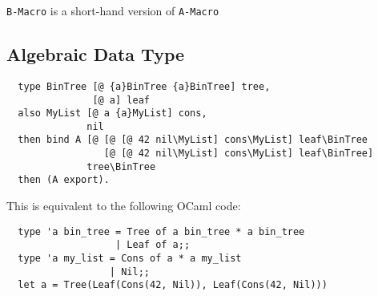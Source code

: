 \documentclass{book}
\begin{document}
\texttt{B-Macro} is a short-hand version of \texttt{A-Macro}

\subsection{Algebraic Data Type}
\label{ssec:adt-example}
\begin{verbatim}
  type BinTree [@ {a}BinTree {a}BinTree] tree,
               [@ a] leaf
  also MyList [@ a {a}MyList] cons,
              nil
  then bind A [@ [@ [@ 42 nil\MyList] cons\MyList] leaf\BinTree
                 [@ [@ 42 nil\MyList] cons\MyList] leaf\BinTree]
              tree\BinTree
  then (A export).
\end{verbatim}

This is equivalent to the following OCaml code:
\begin{verbatim}
  type 'a bin_tree = Tree of a bin_tree * a bin_tree
                   | Leaf of a;;
  type 'a my_list = Cons of a * a my_list
                  | Nil;;
  let a = Tree(Leaf(Cons(42, Nil)), Leaf(Cons(42, Nil)))
\end{verbatim}
\end{document}
